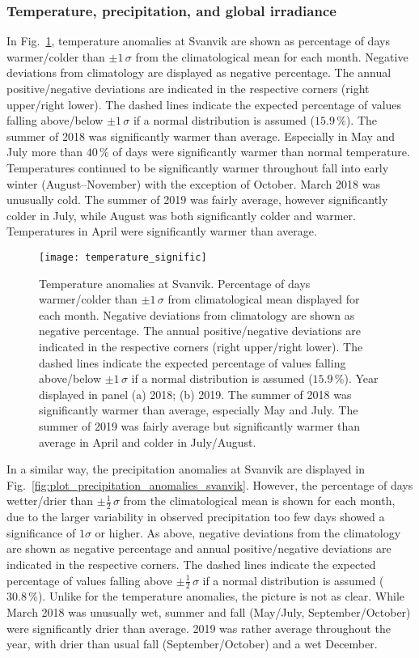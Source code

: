 \documentclass[bg, manuscript]{copernicus}
\begin{document}
\subsubsection{Temperature, precipitation, and global irradiance}
\label{subsubsec:anomal_tpq}
In Fig.~\ref{fig:plot_temperature_anomalies_svanvik}, temperature anomalies at Svanvik are shown as percentage of days warmer/colder than $\pm 1\,\sigma$ from the climatological mean for each month. Negative deviations from climatology are displayed as negative percentage. The annual positive/negative deviations are indicated in the respective corners (right upper/right lower). The dashed lines indicate the expected percentage of values falling above/below $\pm 1\,\sigma$ if a normal distribution is assumed ($15.9\,\unit{\%}$). The summer of 2018 was significantly warmer than average. Especially in May and July more than $40\,\unit{\%}$ of days were significantly warmer than normal temperature. Temperatures continued to be significantly warmer throughout fall into early winter (August--November) with the exception of October. March 2018 was unusually cold. The summer of 2019 was fairly average, however significantly colder in July, while August was both significantly colder and warmer. Temperatures in April were significantly warmer than average.

\begin{figure}[t]
  \texttt{[image: temperature\_signific]}
  \caption{Temperature anomalies at Svanvik. Percentage of days warmer/colder than $\pm 1\,\sigma$ from climatological mean displayed for each month. Negative deviations from climatology are shown as negative percentage. The annual positive/negative deviations are indicated in the respective corners (right upper/right lower). The dashed lines indicate the expected percentage of values falling above/below $\pm 1\,\sigma$ if a normal distribution is assumed ($15.9\,\unit{\%}$). Year displayed in panel (a) 2018; (b) 2019. The summer of 2018 was significantly warmer than average, especially May and July. The summer of 2019 was fairly average but significantly warmer than average in April and colder in July/August.}
  \label{fig:plot_temperature_anomalies_svanvik}
\end{figure}

In a similar way, the precipitation anomalies at Svanvik are displayed in Fig.~\ref{fig:plot_precipitation_anomalies_svanvik}. However, the percentage of days wetter/drier than $\pm \frac{1}{2}\,\sigma$ from the climatological mean is shown for each month, due to the larger variability in observed precipitation too few days showed a significance of $1 \sigma$ or higher. As above, negative deviations from the climatology are shown as negative percentage and annual positive/negative deviations are indicated in the respective corners. The dashed lines indicate the expected percentage of values falling above $\pm\frac{1}{2}\,\sigma$ if a normal distribution is assumed ($30.8\,\unit{\%}$). Unlike for the temperature anomalies, the picture is not as clear. While March 2018 was unusually wet, summer and fall (May/July, September/October) were significantly drier than average. 2019 was rather average throughout the year, with drier than usual fall (September/October) and a wet December.
\end{document}
